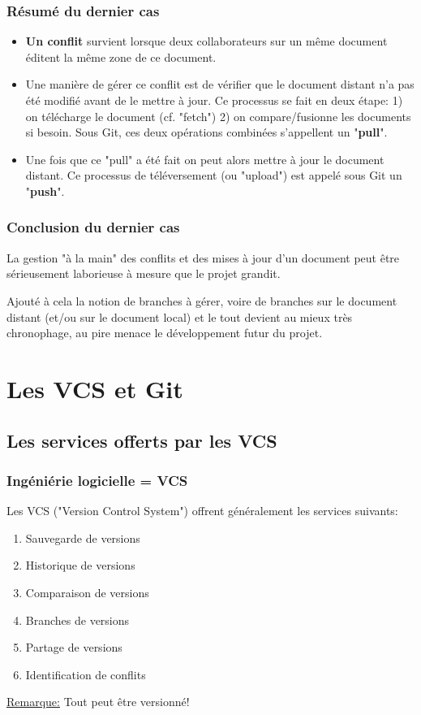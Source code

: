 \documentclass{beamer}
\begin{document}
\begin{frame}
\frametitle{Résumé du dernier cas}
\begin{itemize}
    \item \textbf{Un conflit} survient lorsque deux collaborateurs sur un même document éditent la même zone de ce document.
    \item Une manière de gérer ce conflit est de vérifier que le document distant n'a pas été modifié avant de le mettre à jour. Ce processus se fait en deux étape: 1) on télécharge le document (cf. "fetch") 2) on compare/fusionne les documents si besoin. Sous Git, ces deux opérations combinées s'appellent un "\textbf{pull}". 
    \item Une fois que ce "pull" a été fait on peut alors mettre à jour le document distant. Ce processus de téléversement (ou "upload") est appelé sous Git un "\textbf{push}".
\end{itemize}
\end{frame}

\begin{frame}
\frametitle{Conclusion du dernier cas}
La gestion "à la main" des conflits et des mises à jour d'un document peut être sérieusement laborieuse à mesure que le projet grandit.
\medskip

Ajouté à cela la notion de branches à gérer, voire de branches sur le document distant (et/ou sur le document local) et le tout devient au mieux très chronophage, au pire menace le développement futur du projet.
\medskip
\end{frame}


\section{Les VCS et Git}

\subsection{Les services offerts par les VCS}
\begin{frame}
\frametitle{Ingéniérie logicielle = VCS}

Les VCS ("Version Control System") offrent généralement les services suivants:
\medskip

\begin{enumerate}
    \item Sauvegarde de versions
    \item Historique de versions 
    \item Comparaison de versions
    \item Branches de versions
    \item Partage de versions
    \item Identification de conflits
\end{enumerate}
\medskip

\underline{Remarque:} Tout peut être versionné!
\end{frame}
\end{document}
